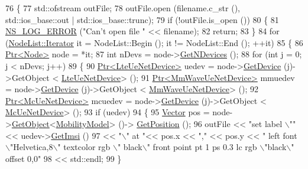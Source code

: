 \begin{DoxyCode}
76 \{
77   std::ofstream outFile;
78   outFile.open (filename.c\_str (), std::ios\_base::out | std::ios\_base::trunc);
79   \textcolor{keywordflow}{if} (!outFile.is\_open ())
80     \{
81       \hyperlink{group__logging_ga0261a8db1d4ac5f79417d117634fd455}{NS\_LOG\_ERROR} (\textcolor{stringliteral}{"Can't open file "} << filename);
82       \textcolor{keywordflow}{return};
83     \}
84   \textcolor{keywordflow}{for} (\hyperlink{classns3_1_1NodeList_a9e2679a94efb4f0066cc21e65440364d}{NodeList::Iterator} it = NodeList::Begin (); it != NodeList::End (); ++it)
85     \{
86       \hyperlink{classns3_1_1Ptr}{Ptr<Node>} node = *it;
87       \textcolor{keywordtype}{int} nDevs = node->\hyperlink{classns3_1_1Node_a531554d2241ba4fa1cd74e3360be6bce}{GetNDevices} ();
88       \textcolor{keywordflow}{for} (\textcolor{keywordtype}{int} j = 0; j < nDevs; j++)
89         \{
90           \hyperlink{classns3_1_1Ptr}{Ptr<LteUeNetDevice>} uedev = node->\hyperlink{classns3_1_1Node_a5918dfd24ef632efc9a83a5f6561c76e}{GetDevice} (j)->GetObject <
      \hyperlink{classns3_1_1LteUeNetDevice}{LteUeNetDevice}> ();
91           \hyperlink{classns3_1_1Ptr}{Ptr<MmWaveUeNetDevice>} mmuedev = node->\hyperlink{classns3_1_1Node_a5918dfd24ef632efc9a83a5f6561c76e}{GetDevice} (j)->GetObject <
      \hyperlink{classns3_1_1MmWaveUeNetDevice}{MmWaveUeNetDevice}> ();
92           \hyperlink{classns3_1_1Ptr}{Ptr<McUeNetDevice>} mcuedev = node->\hyperlink{classns3_1_1Node_a5918dfd24ef632efc9a83a5f6561c76e}{GetDevice} (j)->GetObject <
      \hyperlink{classns3_1_1McUeNetDevice}{McUeNetDevice}> ();
93           \textcolor{keywordflow}{if} (uedev)
94             \{
95               \hyperlink{classns3_1_1Vector3D_a7e59b47bc94c9cb1dadff68c1d0112d8}{Vector} pos = node->\hyperlink{classns3_1_1Object_a13e18c00017096c8381eb651d5bd0783}{GetObject}<\hyperlink{classns3_1_1MobilityModel}{MobilityModel}> ()->
      \hyperlink{lena-cqi-threshold_8cc_acebf763e1a0478cec225f9547941ae54}{GetPosition} ();
96               outFile << \textcolor{stringliteral}{"set label \(\backslash\)""} << uedev->\hyperlink{classns3_1_1LteUeNetDevice_a673405bfed4b45c5714f17b0c3bad334}{GetImsi} ()
97                       << \textcolor{stringliteral}{"\(\backslash\)" at "}<< pos.x << \textcolor{stringliteral}{","} << pos.y << \textcolor{stringliteral}{" left font \(\backslash\)"Helvetica,8\(\backslash\)" textcolor rgb \(\backslash\)"
      black\(\backslash\)" front point pt 1 ps 0.3 lc rgb \(\backslash\)"black\(\backslash\)" offset 0,0"}
98                       << std::endl;
99             \}

\end{DoxyCode}
